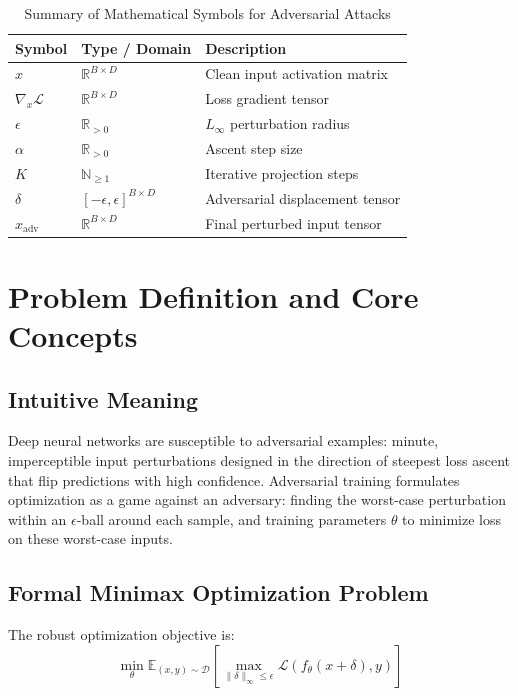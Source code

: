 \documentclass[11pt,a4paper]{article}
\theoremstyle{definition}
\begin{document}
\begin{table}[h]
\centering
\caption{Summary of Mathematical Symbols for Adversarial Attacks}
\begin{tabular}{lll}
\toprule
\textbf{Symbol} & \textbf{Type / Domain} & \textbf{Description} \\
\midrule
$x$ & $\mathbb{R}^{B \times D}$ & Clean input activation matrix \\
$\nabla_x \mathcal{L}$ & $\mathbb{R}^{B \times D}$ & Loss gradient tensor \\
$\epsilon$ & $\mathbb{R}_{> 0}$ & $L_\infty$ perturbation radius \\
$\alpha$ & $\mathbb{R}_{> 0}$ & Ascent step size \\
$K$ & $\mathbb{N}_{\ge 1}$ & Iterative projection steps \\
$\delta$ & $[-\epsilon, \epsilon]^{B \times D}$ & Adversarial displacement tensor \\
$x_{\text{adv}}$ & $\mathbb{R}^{B \times D}$ & Final perturbed input tensor \\
\bottomrule
\end{tabular}
\end{table}

\section{Problem Definition and Core Concepts}

\subsection{Intuitive Meaning}
Deep neural networks are susceptible to adversarial examples: minute, imperceptible input perturbations designed in the direction of steepest loss ascent that flip predictions with high confidence. Adversarial training formulates optimization as a game against an adversary: finding the worst-case perturbation within an $\epsilon$-ball around each sample, and training parameters $\theta$ to minimize loss on these worst-case inputs.

\subsection{Formal Minimax Optimization Problem}
The robust optimization objective is:
\begin{equation}
\min_\theta \mathbb{E}_{(x, y) \sim \mathcal{D}} \left[ \max_{\|\delta\|_\infty \le \epsilon} \mathcal{L}(f_\theta(x + \delta), y) \right]
\end{equation}
\end{document}
